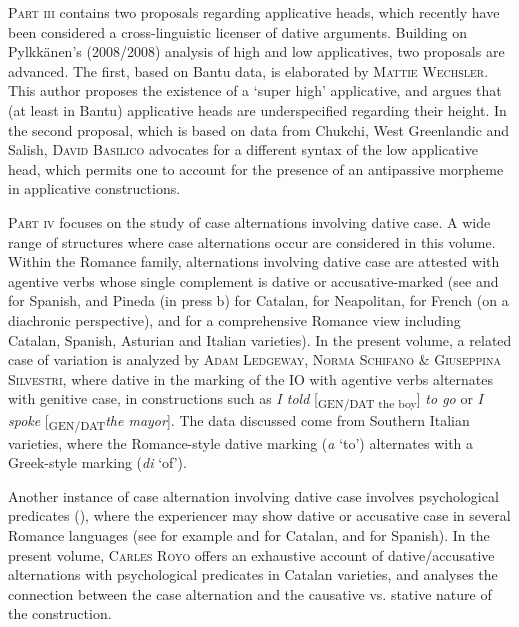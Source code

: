 \documentclass[output=paper,modfonts,nonflat,colorlinks,citecolor=brown]{langsci/langscibook}
\begin{document}
{\textsc{Part iii}} contains two proposals regarding applicative heads, which recently have been considered a cross-linguistic licenser of dative arguments. Building on Pylkkänen’s (2008/2008) analysis of high and low applicatives, two proposals are advanced. The first, based on Bantu data, is elaborated by {\textsc{Mattie Wechsler}}. This author proposes the existence of a ‘super high’ applicative, and argues that (at least in Bantu) applicative heads are underspecified regarding their height. In the second proposal, which is based on data from Chukchi, West Greenlandic and Salish, {\textsc{David Basilico}} advocates for a different syntax of the low applicative head, which permits one to account for the presence of an antipassive morpheme in applicative constructions. 



{\textsc{Part iv}} focuses on the study of case alternations involving dative case. A wide range of structures where case alternations occur are considered in this volume. Within the Romance family, alternations involving dative case are attested with agentive verbs whose single complement is dative or accusative-marked (see \citet{FernándezOrdóñez1999} and \citet{Sáez2009} for Spanish, \citet{Ramos2005,Morant2008,PinedaRoyo2017} and Pineda (in press b) for Catalan, \citet{Ledgeway2000} for Neapolitan, \citet{Troberg2008} for French (on a diachronic perspective), and \citet{Pineda2016} for a comprehensive Romance view including Catalan, Spanish, Asturian and Italian varieties). In the present volume, a related case of variation is analyzed by {\textsc{Adam Ledgeway, Norma Schifano \& Giuseppina Silvestri}}, where dative in the marking of the IO with agentive verbs alternates with genitive case, in constructions such as {\textit{I told}} [{\textsubscript{GEN/DAT the boy}}]{ \textit{to go}} or {\textit{I spoke}} [{\textsubscript{GEN/DAT}\textit{the mayor}}]. The data discussed come from Southern Italian varieties, where the Romance-style dative marking ({\textit{a}} ‘to’) alternates with a Greek-style marking ({\textit{di}} ‘of’). 



Another instance of case alternation involving dative case involves psychological predicates ({\citealt{BellettiRizzi1988}}), where the experiencer may show dative or accusative case in several Romance languages (see for example \citet{MateuCabré2002,PinedaRoyo2017} and \citet{Royo2017} for Catalan, and \citet{FernándezOrdóñez1999} for Spanish). In the present volume, {\textsc{Carles Royo}} offers an exhaustive account of dative/accusative alternations with psychological predicates in Catalan varieties, and analyses the connection between the case alternation and the causative vs. stative nature of the construction.
\end{document}
